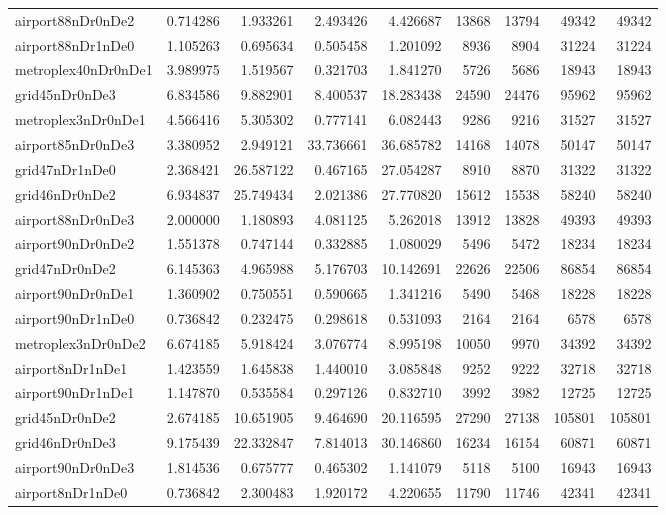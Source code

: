 \begin{longtable}{|l|r|r|r|r|r|r|r|r|}
airport88nDr0nDe2 & 0.714286 & 1.933261 & 2.493426 & 4.426687 & 13868 & 13794 & 49342 & 49342 \\
airport88nDr1nDe0 & 1.105263 & 0.695634 & 0.505458 & 1.201092 & 8936 & 8904 & 31224 & 31224 \\
metroplex40nDr0nDe1 & 3.989975 & 1.519567 & 0.321703 & 1.841270 & 5726 & 5686 & 18943 & 18943 \\
grid45nDr0nDe3 & 6.834586 & 9.882901 & 8.400537 & 18.283438 & 24590 & 24476 & 95962 & 95962 \\
metroplex3nDr0nDe1 & 4.566416 & 5.305302 & 0.777141 & 6.082443 & 9286 & 9216 & 31527 & 31527 \\
airport85nDr0nDe3 & 3.380952 & 2.949121 & 33.736661 & 36.685782 & 14168 & 14078 & 50147 & 50147 \\
grid47nDr1nDe0 & 2.368421 & 26.587122 & 0.467165 & 27.054287 & 8910 & 8870 & 31322 & 31322 \\
grid46nDr0nDe2 & 6.934837 & 25.749434 & 2.021386 & 27.770820 & 15612 & 15538 & 58240 & 58240 \\
airport88nDr0nDe3 & 2.000000 & 1.180893 & 4.081125 & 5.262018 & 13912 & 13828 & 49393 & 49393 \\
airport90nDr0nDe2 & 1.551378 & 0.747144 & 0.332885 & 1.080029 & 5496 & 5472 & 18234 & 18234 \\
grid47nDr0nDe2 & 6.145363 & 4.965988 & 5.176703 & 10.142691 & 22626 & 22506 & 86854 & 86854 \\
airport90nDr0nDe1 & 1.360902 & 0.750551 & 0.590665 & 1.341216 & 5490 & 5468 & 18228 & 18228 \\
airport90nDr1nDe0 & 0.736842 & 0.232475 & 0.298618 & 0.531093 & 2164 & 2164 & 6578 & 6578 \\
metroplex3nDr0nDe2 & 6.674185 & 5.918424 & 3.076774 & 8.995198 & 10050 & 9970 & 34392 & 34392 \\
airport8nDr1nDe1 & 1.423559 & 1.645838 & 1.440010 & 3.085848 & 9252 & 9222 & 32718 & 32718 \\
airport90nDr1nDe1 & 1.147870 & 0.535584 & 0.297126 & 0.832710 & 3992 & 3982 & 12725 & 12725 \\
grid45nDr0nDe2 & 2.674185 & 10.651905 & 9.464690 & 20.116595 & 27290 & 27138 & 105801 & 105801 \\
grid46nDr0nDe3 & 9.175439 & 22.332847 & 7.814013 & 30.146860 & 16234 & 16154 & 60871 & 60871 \\
airport90nDr0nDe3 & 1.814536 & 0.675777 & 0.465302 & 1.141079 & 5118 & 5100 & 16943 & 16943 \\
airport8nDr1nDe0 & 0.736842 & 2.300483 & 1.920172 & 4.220655 & 11790 & 11746 & 42341 & 42341 \\

\end{longtable}
